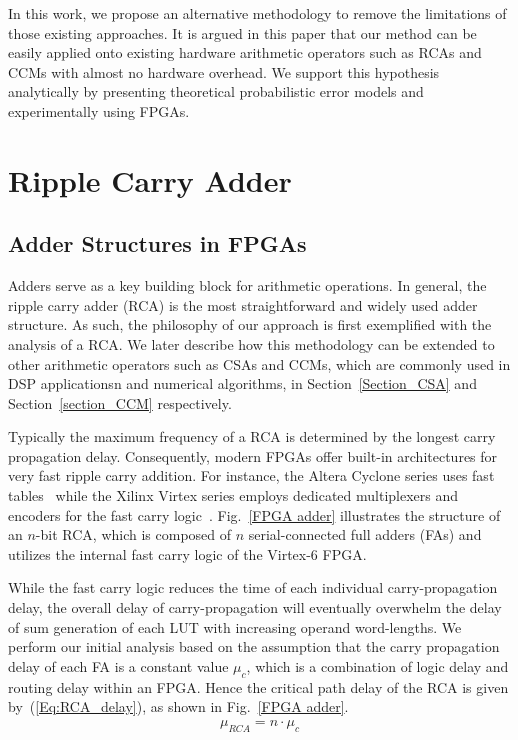 \documentclass[prodmode,acmtrets]{acmsmall} %
\begin{document}
In this work, we propose an alternative methodology to remove the limitations of those existing approaches. It is argued in this paper that our method can be easily applied onto existing hardware arithmetic operators such as RCAs and CCMs with almost no hardware overhead. We support this hypothesis analytically by presenting theoretical probabilistic error models and experimentally using FPGAs.

\section{Ripple Carry Adder}\label{section_RCA}
\subsection{Adder Structures in FPGAs}
Adders serve as a key building block for arithmetic operations. In general, the ripple carry adder (RCA) is the most straightforward and widely used adder structure. As such, the philosophy of our approach is first exemplified with the analysis of a RCA. We later describe how this methodology can be extended to other arithmetic operators such as CSAs and CCMs, which are commonly used in DSP applicationsn and numerical algorithms, in Section~\ref{Section_CSA} and Section~\ref{section_CCM} respectively. 


Typically the maximum frequency of a RCA is determined by the longest carry propagation delay. Consequently, modern FPGAs offer built-in architectures for very fast ripple carry addition. For instance, the Altera Cyclone series uses fast tables~\cite{AlteraCyclone} while the Xilinx Virtex series employs dedicated multiplexers and encoders for the fast carry logic~\cite{Virtex6}. Fig.~\ref{FPGA adder} illustrates the structure of an $n$-bit RCA, which is composed of $n$ serial-connected full adders (FAs) and utilizes the internal fast carry logic of the Virtex-6 FPGA.

While the fast carry logic reduces the time of each individual carry-propagation delay, the overall delay of carry-propagation will eventually overwhelm the delay of sum generation of each LUT with increasing operand word-lengths. We perform our initial analysis based on the assumption that the carry propagation delay of each FA is a constant value $\mu_c$, which is a combination of logic delay and routing delay within an FPGA. Hence the critical path delay of the RCA is given by~(\ref{Eq:RCA_delay}), as shown in Fig.~\ref{FPGA adder}.
%
\begin{eqnarray}\label{Eq:RCA_delay}
	\mu_{RCA}=n\cdot\mu_c
\end{eqnarray}
\end{document}
